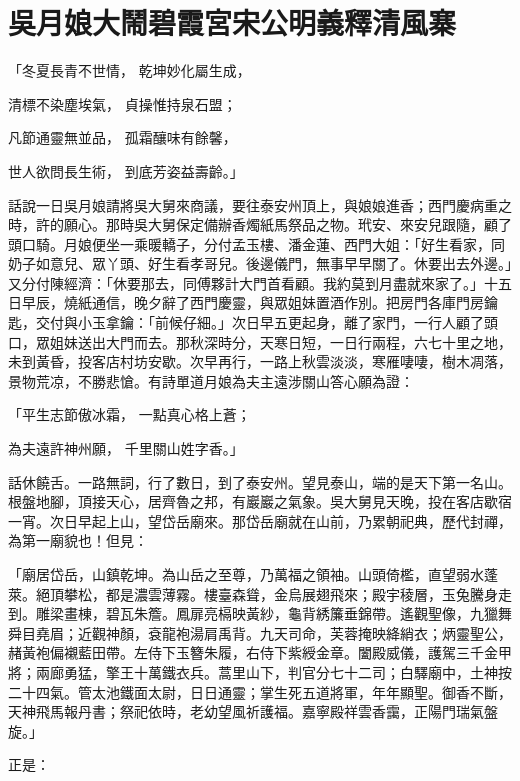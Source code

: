 %

\chapter{吳月娘大鬧碧霞宮\KG 宋公明義釋清風寨}

「冬夏長青不世情，  乾坤妙化屬生成，

清標不染塵埃氣，  貞操惟持泉石盟；

凡節通靈無並品，  孤霜釀味有餘馨，

世人欲問長生術，  到底芳姿益壽齡。」

話說一日吳月娘請將吳大舅來商議，要往泰安州頂上，與娘娘進香；西門慶病重之時，許的願心。那時吳大舅保定備辦香燭紙馬祭品之物。玳安、來安兒跟隨，顧了頭口騎。月娘便坐一乘暖轎子，分付孟玉樓、潘金蓮、西門大姐：「好生看家，同奶子如意兒、眾丫頭、好生看孝哥兒。後邊儀門，無事早早關了。休要出去外邊。」又分付陳經濟：「休要那去，同傅夥計大門首看顧。我約莫到月盡就來家了。」十五日早辰，燒紙通信，晚夕辭了西門慶靈，與眾姐妹置酒作別。把房門各庫門房鑰匙，交付與小玉拿鑰：「前候仔細。」次日早五更起身，離了家門，一行人顧了頭口，眾姐妹送出大門而去。那秋深時分，天寒日短，一日行兩程，六七十里之地，未到黃昏，投客店村坊安歇。次早再行，一路上秋雲淡淡，寒雁啛啛，樹木凋落，景物荒凉，不勝悲愴。有詩單道月娘為夫主遠涉關山答心願為證：

「平生志節傲冰霜，  一點真心格上蒼；

為夫遠許神州願，  千里關山姓字香。」

話休饒舌。一路無詞，行了數日，到了泰安州。望見泰山，端的是天下第一名山。根盤地腳，頂接天心，居齊魯之邦，有巖巖之氣象。吳大舅見天晚，投在客店歇宿一宵。次日早起上山，望岱岳廟來。那岱岳廟就在山前，乃累朝祀典，歷代封禪，為第一廟貌也！但見：

「廟居岱岳，山鎮乾坤。為山岳之至尊，乃萬福之領袖。山頭倚檻，直望弱水蓬萊。絕頂攀松，都是濃雲薄霧。樓臺森聳，金烏展翅飛來；殿宇稜層，玉兔騰身走到。雕梁畫棟，碧瓦朱簷。鳳扉亮槅映黃紗，龜背綉簾垂錦帶。遙觀聖像，九獵舞舜目堯眉；近觀神顏，袞龍袍湯肩禹背。九天司命，芙蓉掩映絳綃衣；炳靈聖公，赭黃袍偏襯藍田帶。左侍下玉簪朱履，右侍下紫綬金章。闔殿威儀，護駕三千金甲將；兩廊勇猛，擎王十萬鐵衣兵。蒿里山下，判官分七十二司；白驛廟中，土神按二十四氣。管太池鐵面太尉，日日通靈；掌生死五道將軍，年年顯聖。御香不斷，天神飛馬報丹書；祭祀依時，老幼望風祈護福。嘉寧殿祥雲香靄，正陽門瑞氣盤旋。」

正是：

